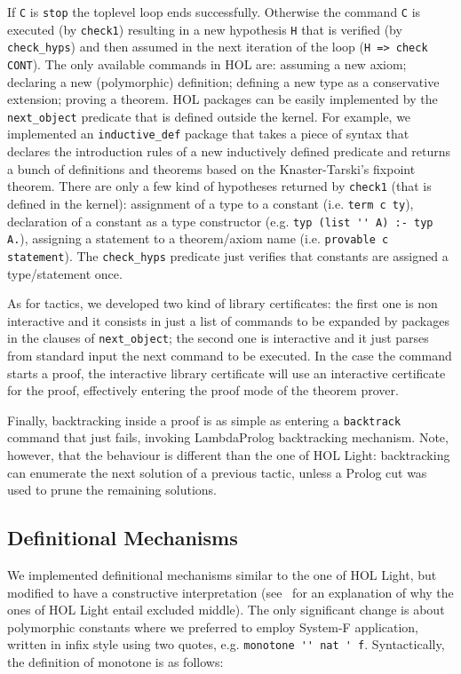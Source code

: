 \documentclass[preprint]{sigplanconf}
\begin{document}
If \verb+C+ is \verb+stop+ the toplevel loop ends successfully. Otherwise the command \verb+C+ is executed (by \verb+check1+) resulting in a new hypothesis \verb+H+ that is verified (by \verb+check_hyps+) and then assumed in the next iteration of the loop (\verb+H => check CONT+). The only available commands in HOL are: assuming a new axiom; declaring a new (polymorphic) definition; defining a new type as a conservative extension; proving a theorem. HOL packages can be easily implemented by the \verb+next_object+ predicate that is defined outside the kernel. For example, we implemented an \verb+inductive_def+ package that takes a piece of syntax that declares the introduction rules of a new inductively defined predicate and returns a bunch of definitions and theorems based on the Knaster-Tarski's fixpoint theorem. There are only a few kind of hypotheses returned by \verb+check1+ (that is defined in the kernel): assignment of a type to a constant (i.e. \verb+term c ty+), declaration of a constant as a type constructor (e.g. \verb+typ (list '' A) :- typ A.+), assigning a statement to a theorem/axiom name (i.e. \verb+provable c statement+). The \verb+check_hyps+ predicate just verifies that constants are assigned a type/statement once.

As for tactics, we developed two kind of library certificates: the first one is non interactive and it consists in just a list of commands to be expanded by packages in the clauses of \verb+next_object+; the second one is interactive and it just parses from standard input the next command to be executed. In the case the command starts a proof, the interactive library certificate will use an interactive certificate for the proof, effectively entering the proof mode of the theorem prover.

Finally, backtracking inside a proof is as simple as entering a \verb+backtrack+ command that just fails, invoking LambdaProlog backtracking mechanism. Note, however, that the behaviour is different than the one of HOL Light: backtracking can enumerate the next solution of a previous tactic, unless a Prolog cut was used to prune the remaining solutions.

\subsection{Definitional Mechanisms}

We implemented definitional mechanisms similar to the one of HOL Light, but modified to have a constructive interpretation (see~\cite{arthan} for an explanation of why the ones of HOL Light entail excluded middle). The only significant change is about polymorphic constants where we preferred to employ System-F application, written in infix style using two quotes, e.g. \verb+monotone '' nat ' f+. Syntactically, the definition of monotone is as follows:
\end{document}
